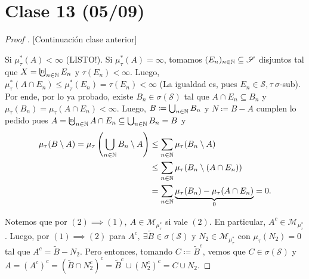 \section{Clase 13 (05/09)}

\begin{proof}[Proof ][Continuación clase anterior]
	\text{} \par
	\noindent {} Si $\mu_{\tau}^{*}(A) < \infty$ (LISTO!). Si $\mu_{\tau}^{*}(A) = \infty$, tomamos $(E_n)_{n\in\mathbb{N}} \subseteq \mathscr{S}$ disjuntos tal que $X = \textbigcupd_{n\in\N} E_n$ y $\tau(E_n) < \infty$. Luego, $\mu_{\tau}^{*}(A \cap E_n) \leq \mu_{\tau}^{*} (E_n) = \tau(E_n) < \infty$ (La igualdad es, pues $E_n \in \mathscr{S}, \tau \ \sigma$-sub). Por ende, por lo ya probado, existe $B_n \in \sigma(\mathscr{S})$ tal que $A \cap E_n \subseteq B_n$ y $\mu_{\tau}(B_n) = \mu_{\tau}(A \cap E_n) < \infty$. Luego, $B \coloneq \bigcup_{n\in\mathbb{N}} B_n$ y $N \coloneq B-A$ cumplen lo pedido pues $A = \textbigcupd_{n\in\N} A \cap E_n \subseteq \bigcup_{n\in\N} B_n = B$ y
	\begin{align*}
		\mu_{\tau}(B\setminus A) = \mu_{\tau}\left( \bigcup_{n\in\mathbb{N}} B_n \setminus A \right) & \leq \sum_{n\in\mathbb{N}} \mu_{\tau}(B_n \setminus A) \\
		& \leq \sum_{n\in\mathbb{N}} \mu_{\tau}(B_n \setminus (A \cap E_n)) \\
		&= \sum_{n\in\mathbb{N}} \underbrace{\mu_{\tau}(B_n) - \mu_{\tau}(A \cap E_n)}_{0} = 0 
	.\end{align*}

	\noindent {} Notemos que por $(2) \implies (1),\ A \in \mathscr{M}_{\mu_{\tau}^{*}}$ si vale $(2)$. En particular, $A^c \in \mathscr{M}_{\mu_{\tau}^{*}}$. Luego, por $(1) \implies (2)$ para $A^c,\ \exists \widetilde{B} \in \sigma(\mathscr{S})$ y $N_2 \in \mathscr{M}_{\mu_{\tau}^{*}}$ con $\mu_{\tau}(N_{2}) = 0$ tal que $A^c = \widetilde{B} - N_{2}$. Pero entonces, tomando $C \coloneq \widetilde{B}^c$, vemos que $C \in \sigma(\mathscr{S})$ y $A = (A^c)^c = (\widetilde{B} \cap N_{2}^c)^c = \widetilde{B}^c \cup (N_{2}^c)^c = C \cup N_2$.
\end{proof}

